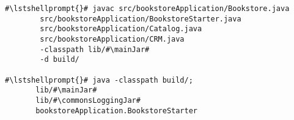 \begin{lstlisting}[caption=Command to compile and run the instrumented Bookstore under Windows,label=lst:bookstoreStarterWin]
#\lstshellprompt{}# javac src/bookstoreApplication/Bookstore.java 
        src/bookstoreApplication/BookstoreStarter.java 
        src/bookstoreApplication/Catalog.java 
        src/bookstoreApplication/CRM.java 
        -classpath lib/#\mainJar#
        -d build/

#\lstshellprompt{}# java -classpath build/;
       lib/#\mainJar#
       lib/#\commonsLoggingJar#
       bookstoreApplication.BookstoreStarter 
\end{lstlisting}
